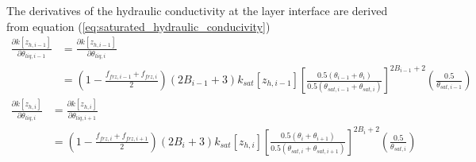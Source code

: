 \documentclass[12pt,authoryear]{elsarticle}
\numberwithin{equation}{section} %
\begin{document}
The derivatives of the hydraulic conductivity at the layer interface are derived from equation (\ref{eq:saturated_hydraulic_conducivity}) 
\begin{equation} 
\begin{aligned}
\frac{\partial k[z_{h,i-1}]}{\partial \theta_{liq,i-1}}
&= \frac{\partial k[z_{h,i-1}]}{\partial \theta_{liq,i}}\\
&=\left(1-\frac{f_{frz,i-1}+f_{frz,i}}{2}\right)(2B_{i-1}+3)k_{sat}[z_{h,i-1}]\left[\frac{0.5(\theta_{i-1}+\theta_{i})}{0.5(\theta_{sat,i-1}+\theta_{sat,i})}\right]^{2B_{i-1}+2}\left(\frac{0.5}{\theta_{sat,i-1}}\right)
\end{aligned}
\end{equation}
\begin{equation} 
\begin{aligned}
\frac{\partial k[z_{h,i}]}{\partial \theta_{liq,i}}
&= \frac{\partial k[z_{h,i}]}{\partial \theta_{liq,i+1}}\\
&=\left(1-\frac{f_{frz,i}+f_{frz,i+1}}{2}\right)(2B_{i}+3)k_{sat}[z_{h,i}]\left[\frac{0.5(\theta_{i}+\theta_{i+1})}{0.5(\theta_{sat,i}+\theta_{sat,i+1})}\right]^{2B_{i}+2}\left(\frac{0.5}{\theta_{sat,i}}\right)
\end{aligned}
\end{equation}

\end{document}
